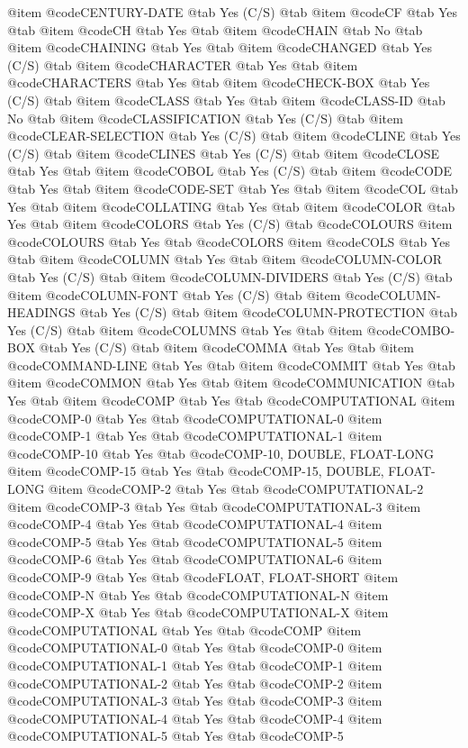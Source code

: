 @item @code{CENTURY-DATE} @tab Yes	(C/S) @tab
@item @code{CF} @tab Yes @tab
@item @code{CH} @tab Yes @tab
@item @code{CHAIN} @tab No @tab
@item @code{CHAINING} @tab Yes @tab
@item @code{CHANGED} @tab Yes (C/S) @tab
@item @code{CHARACTER} @tab Yes @tab
@item @code{CHARACTERS} @tab Yes @tab
@item @code{CHECK-BOX} @tab Yes	(C/S) @tab
@item @code{CLASS} @tab Yes @tab
@item @code{CLASS-ID} @tab No @tab
@item @code{CLASSIFICATION} @tab Yes	(C/S) @tab
@item @code{CLEAR-SELECTION} @tab Yes	(C/S) @tab
@item @code{CLINE} @tab Yes	(C/S) @tab
@item @code{CLINES} @tab Yes	(C/S) @tab
@item @code{CLOSE} @tab Yes @tab
@item @code{COBOL} @tab Yes	(C/S) @tab
@item @code{CODE} @tab Yes @tab
@item @code{CODE-SET} @tab Yes @tab
@item @code{COL} @tab Yes @tab
@item @code{COLLATING} @tab Yes @tab
@item @code{COLOR} @tab Yes @tab
@item @code{COLORS} @tab Yes	(C/S) @tab @code{COLOURS}
@item @code{COLOURS} @tab Yes @tab @code{COLORS}
@item @code{COLS} @tab Yes @tab
@item @code{COLUMN} @tab Yes @tab
@item @code{COLUMN-COLOR} @tab Yes	(C/S) @tab
@item @code{COLUMN-DIVIDERS} @tab Yes	(C/S) @tab
@item @code{COLUMN-FONT} @tab Yes	(C/S) @tab
@item @code{COLUMN-HEADINGS} @tab Yes	(C/S) @tab
@item @code{COLUMN-PROTECTION} @tab Yes	(C/S) @tab
@item @code{COLUMNS} @tab Yes @tab
@item @code{COMBO-BOX} @tab Yes	(C/S) @tab
@item @code{COMMA} @tab Yes @tab
@item @code{COMMAND-LINE} @tab Yes @tab
@item @code{COMMIT} @tab Yes @tab
@item @code{COMMON} @tab Yes @tab
@item @code{COMMUNICATION} @tab Yes @tab
@item @code{COMP} @tab Yes @tab @code{COMPUTATIONAL}
@item @code{COMP-0} @tab Yes @tab @code{COMPUTATIONAL-0}
@item @code{COMP-1} @tab Yes @tab @code{COMPUTATIONAL-1}
@item @code{COMP-10} @tab Yes @tab @code{COMP-10, DOUBLE, FLOAT-LONG}
@item @code{COMP-15} @tab Yes @tab @code{COMP-15, DOUBLE, FLOAT-LONG}
@item @code{COMP-2} @tab Yes @tab @code{COMPUTATIONAL-2}
@item @code{COMP-3} @tab Yes @tab @code{COMPUTATIONAL-3}
@item @code{COMP-4} @tab Yes @tab @code{COMPUTATIONAL-4}
@item @code{COMP-5} @tab Yes @tab @code{COMPUTATIONAL-5}
@item @code{COMP-6} @tab Yes @tab @code{COMPUTATIONAL-6}
@item @code{COMP-9} @tab Yes @tab @code{FLOAT, FLOAT-SHORT}
@item @code{COMP-N} @tab Yes @tab @code{COMPUTATIONAL-N}
@item @code{COMP-X} @tab Yes @tab @code{COMPUTATIONAL-X}
@item @code{COMPUTATIONAL} @tab Yes @tab @code{COMP}
@item @code{COMPUTATIONAL-0} @tab Yes @tab @code{COMP-0}
@item @code{COMPUTATIONAL-1} @tab Yes @tab @code{COMP-1}
@item @code{COMPUTATIONAL-2} @tab Yes @tab @code{COMP-2}
@item @code{COMPUTATIONAL-3} @tab Yes @tab @code{COMP-3}
@item @code{COMPUTATIONAL-4} @tab Yes @tab @code{COMP-4}
@item @code{COMPUTATIONAL-5} @tab Yes @tab @code{COMP-5}
